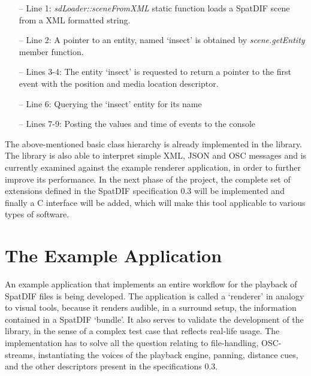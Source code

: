\documentclass[a4paper]{article}
\begin{document}
\begin{itemize}[leftmargin=*]
\item[--] Line 1: {\it sdLoader::sceneFromXML} static function loads a SpatDIF scene from a XML formatted string.
\item[--] Line 2: A pointer to an entity, named `insect' is obtained by {\it scene.getEntity} member function.
\item[--] Lines 3-4: The entity `insect' is requested to return a pointer to the first event with the position and media location descriptor.
\item[--] Line 6: Querying the `insect' entity for its name
\item[--] Lines 7-9: Posting the values and time of events to the console
\end{itemize}


The above-mentioned basic class hierarchy is already implemented in the library. 
The library is also able to interpret simple XML, JSON and OSC messages and is currently examined against the example renderer application, in order to further improve its performance.  
In the next phase of the project, the complete set of extensions defined in the SpatDIF specification 0.3 \cite{SpatDIF:Specs} will be implemented and finally a C interface will be added, which will make this tool applicable to various types of software. 

\section{The Example Application}%

An example application that implements an entire workflow for the playback of SpatDIF files is being developed. The application is called a `renderer' in analogy to visual tools, because it renders audible, in a surround setup, the information contained in a SpatDIF `bundle'.
It also serves to validate the development of the library, in the sense of a complex test case that reflects real-life usage.
The implementation has to solve all the question relating to file-handling, OSC-streams, instantiating the voices of the playback engine, panning, distance cues, and the other descriptors present in the specifications 0.3.
\end{document}
